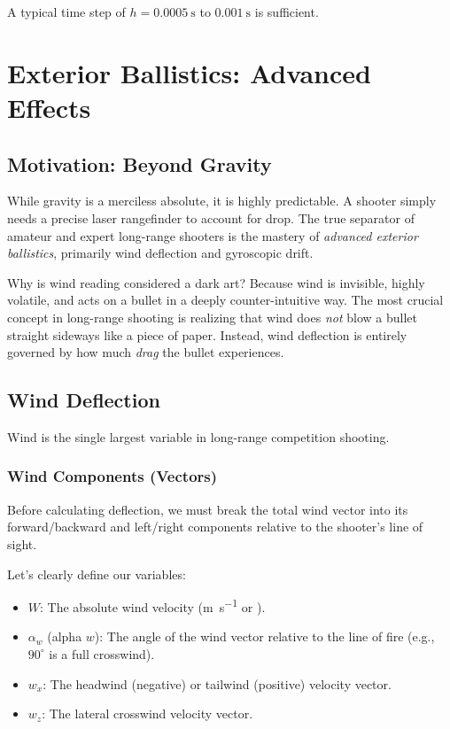 \documentclass[11pt,twoside,openright]{report}
\begin{document}
A typical time step of $h = \SI{0.0005}{\second}$ to $\SI{0.001}{\second}$ is sufficient.


\chapter{Exterior Ballistics: Advanced Effects}
\label{ch:advanced}

\section{Motivation: Beyond Gravity}

While gravity is a merciless absolute, it is highly predictable. A shooter simply needs a precise laser rangefinder to account for drop. The true separator of amateur and expert long-range shooters is the mastery of \emph{advanced exterior ballistics}, primarily wind deflection and gyroscopic drift.

Why is wind reading considered a dark art? Because wind is invisible, highly volatile, and acts on a bullet in a deeply counter-intuitive way. The most crucial concept in long-range shooting is realizing that wind does \emph{not} blow a bullet straight sideways like a piece of paper. Instead, wind deflection is entirely governed by how much \emph{drag} the bullet experiences. 

\section{Wind Deflection}
\label{sec:wind}

Wind is the single largest variable in long-range competition shooting.

\subsection{Wind Components (Vectors)}

Before calculating deflection, we must break the total wind vector into its forward/backward and left/right components relative to the shooter's line of sight.

Let's clearly define our variables:
\begin{itemize}[noitemsep]
    \item $W$: The absolute wind velocity (\si{\meter\per\second} or \si{\mph}).
    \item $\alpha_w$ (alpha $w$): The angle of the wind vector relative to the line of fire (e.g., $90^\circ$ is a full crosswind).
    \item $w_x$: The headwind (negative) or tailwind (positive) velocity vector.
    \item $w_z$: The lateral crosswind velocity vector.
\end{itemize}
\end{document}

